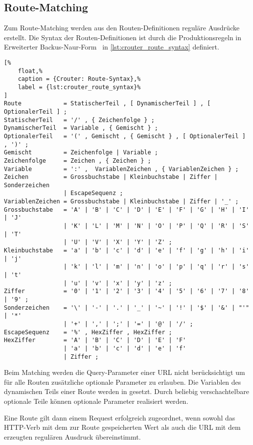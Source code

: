 \subsection{Route-Matching}
\label{ssec:br_route_matching}

Zum Route-Matching werden aus den Routen-Definitionen reguläre Ausdrücke
erstellt.  Die Syntax der Routen-Definitionen ist durch die Produktionsregeln
in Erweiterter Backus-Naur-Form~\cite{ebnf} in \cref{lst:crouter_route_syntax}
definiert.

\begin{lstlisting}[%
	float,%
	caption = {Crouter: Route-Syntax},%
	label = {lst:crouter_route_syntax}%
]
Route            = StatischerTeil , [ DynamischerTeil ] , [ OptionalerTeil ] ;
StatischerTeil   = '/' , { Zeichenfolge } ;
DynamischerTeil  = Variable , { Gemischt } ;
OptionalerTeil   = '(' , Gemischt , { Gemischt } , [ OptionalerTeil ] , ')' ;
Gemischt         = Zeichenfolge | Variable ;
Zeichenfolge     = Zeichen , { Zeichen } ;
Variable         = ':' ,  VariablenZeichen , { VariablenZeichen } ;
Zeichen          = Grossbuchstabe | Kleinbuchstabe | Ziffer | Sonderzeichen
                 | EscapeSequenz ;
VariablenZeichen = Grossbuchstabe | Kleinbuchstabe | Ziffer | '_' ;
Grossbuchstabe   = 'A' | 'B' | 'C' | 'D' | 'E' | 'F' | 'G' | 'H' | 'I' | 'J'
                 | 'K' | 'L' | 'M' | 'N' | 'O' | 'P' | 'Q' | 'R' | 'S' | 'T'
                 | 'U' | 'V' | 'X' | 'Y' | 'Z' ;
Kleinbuchstabe   = 'a' | 'b' | 'c' | 'd' | 'e' | 'f' | 'g' | 'h' | 'i' | 'j'
                 | 'k' | 'l' | 'm' | 'n' | 'o' | 'p' | 'q' | 'r' | 's' | 't'
                 | 'u' | 'v' | 'x' | 'y' | 'z' ;
Ziffer           = '0' | '1' | '2' | '3' | '4' | '5' | '6' | '7' | '8' | '9' ;
Sonderzeichen    = '\' | '-' | '.' | '_' | '~' | '!' | '$' | '&' | "'" | '*'
                 | '+' | ',' | ';' | '=' | '@' | '/' ;
EscapeSequenz    = '%' , HexZiffer , HexZiffer ;
HexZiffer        = 'A' | 'B' | 'C' | 'D' | 'E' | 'F'
                 | 'a' | 'b' | 'c' | 'd' | 'e' | 'f'
                 | Ziffer ;
\end{lstlisting}

Beim Matching werden die Query-Parameter einer URL nicht berücksichtigt um für
alle Routen zusätzliche optionale Parameter zu erlauben.  Die Variablen des
dynamischen Teils einer Route werden in  gesetzt.  Durch beliebig
verschachtelbare optionale Teile können optionale Parameter realisiert werden.

Eine Route gilt dann einem Request erfolgreich zugeordnet, wenn sowohl
das HTTP-Verb mit dem zur Route gespeicherten Wert als auch die URL mit dem
erzeugten regulären Ausdruck übereinstimmt.
